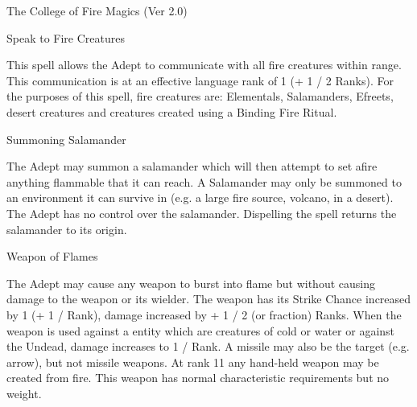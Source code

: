 \begin{Chapter}{The College of Fire Magics (Ver 2.0)}
\begin{spell}[S-10]{Speak to Fire Creatures}

\begin{effects}
This spell allows the Adept to communicate with all fire creatures
within range.  This communication is at an effective language rank of
1 (+ 1 / 2 Ranks).  For the purposes of this spell, fire creatures
are: Elementals, Salamanders, Efreets, desert creatures and creatures
created using a Binding Fire Ritual.
\end{effects}
\end{spell}

\begin{spell}[S-11]{Summoning Salamander}

\begin{effects}
The Adept may summon a salamander which will then attempt to set afire
anything flammable that it can reach. A Salamander may only be
summoned to an environment it can survive in (e.g.  a large fire
source, volcano, in a desert). The Adept has no control over the
salamander. Dispelling the spell returns the salamander to its origin.

\end{effects}
\end{spell}

\begin{spell}[S-12]{Weapon of Flames}

\begin{effects}
The Adept may cause any weapon to burst into flame but without causing
damage to the weapon or its wielder.  The weapon has its Strike Chance
increased by 1 (+ 1 / Rank), damage increased by + 1 / 2 (or fraction)
Ranks.  When the weapon is used against a entity which are creatures
of cold or water or against the Undead, damage increases to 1 / Rank.
A missile may also be the target (e.g.  arrow), but not missile
weapons.  At rank 11 any hand-held weapon may be created from fire.
This weapon has normal characteristic requirements but no weight.
\end{effects}
\end{spell}


\end{Chapter}
